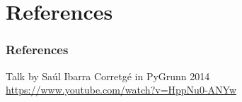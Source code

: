 \documentclass[compress,usenames,dvipsnames]{beamer}
\begin{document}
\section{References}
\begin{frame}\frametitle{References}
    \begin{thebibliography}{9}
        Talk by Saúl Ibarra Corretgé in PyGrunn 2014
        \url{https://www.youtube.com/watch?v=HppNu0-ANYw} 
    \end{thebibliography}
\end{frame}
\end{document}
